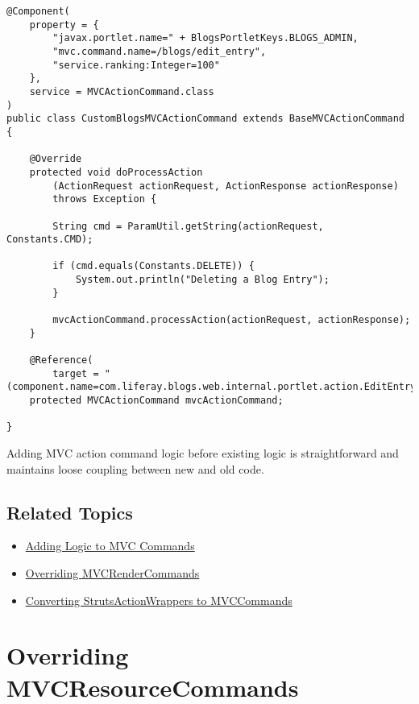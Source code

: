 \begin{verbatim}
@Component(
    property = { 
        "javax.portlet.name=" + BlogsPortletKeys.BLOGS_ADMIN, 
        "mvc.command.name=/blogs/edit_entry",
        "service.ranking:Integer=100" 
    }, 
    service = MVCActionCommand.class
)
public class CustomBlogsMVCActionCommand extends BaseMVCActionCommand {

    @Override
    protected void doProcessAction
        (ActionRequest actionRequest, ActionResponse actionResponse) 
        throws Exception {

        String cmd = ParamUtil.getString(actionRequest, Constants.CMD);

        if (cmd.equals(Constants.DELETE)) {
            System.out.println("Deleting a Blog Entry");
        }

        mvcActionCommand.processAction(actionRequest, actionResponse);
    }

    @Reference(
        target = "(component.name=com.liferay.blogs.web.internal.portlet.action.EditEntryMVCActionCommand)")
    protected MVCActionCommand mvcActionCommand;

}
\end{verbatim}

Adding MVC action command logic before existing logic is straightforward
and maintains loose coupling between new and old code.

\section{Related Topics}\label{related-topics-29}

\begin{itemize}
\tightlist
\item
  \href{/docs/7-2/customization/-/knowledge_base/c/adding-logic-to-mvc-commands}{Adding
  Logic to MVC Commands}
\item
  \href{/docs/7-2/customization/-/knowledge_base/c/overriding-mvcrendercommand}{Overriding
  MVCRenderCommands}
\item
  \href{/docs/7-2/tutorials/-/knowledge_base/t/upgrading-struts-action-hooks}{Converting
  StrutsActionWrappers to MVCCommands}
\end{itemize}

\chapter{Overriding
MVCResourceCommands}\label{overriding-mvcresourcecommands}

